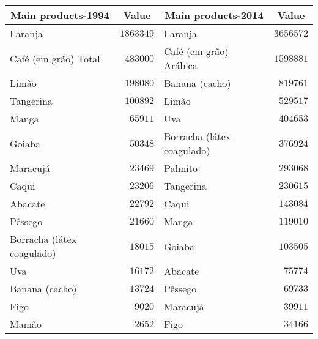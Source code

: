 \begin{table}[!tbp]
\begin{center}
\begin{tabular}{lrlr}
\hline\hline
\multicolumn{1}{c}{Main products-1994}&\multicolumn{1}{c}{Value}&\multicolumn{1}{c}{Main products-2014}&\multicolumn{1}{c}{Value}\tabularnewline
\hline
Laranja&$1863349$&Laranja&$3656572$\tabularnewline
Café (em grão) Total&$ 483000$&Café (em grão) Arábica&$1598881$\tabularnewline
Limão&$ 198080$&Banana (cacho)&$ 819761$\tabularnewline
Tangerina&$ 100892$&Limão&$ 529517$\tabularnewline
Manga&$  65911$&Uva&$ 404653$\tabularnewline
Goiaba&$  50348$&Borracha (látex coagulado)&$ 376924$\tabularnewline
Maracujá&$  23469$&Palmito&$ 293068$\tabularnewline
Caqui&$  23206$&Tangerina&$ 230615$\tabularnewline
Abacate&$  22792$&Caqui&$ 143084$\tabularnewline
Pêssego&$  21660$&Manga&$ 119010$\tabularnewline
Borracha (látex coagulado)&$  18015$&Goiaba&$ 103505$\tabularnewline
Uva&$  16172$&Abacate&$  75774$\tabularnewline
Banana (cacho)&$  13724$&Pêssego&$  69733$\tabularnewline
Figo&$   9020$&Maracujá&$  39911$\tabularnewline
Mamão&$   2652$&Figo&$  34166$\tabularnewline
\hline
\end{tabular}\end{center}

\end{table}
